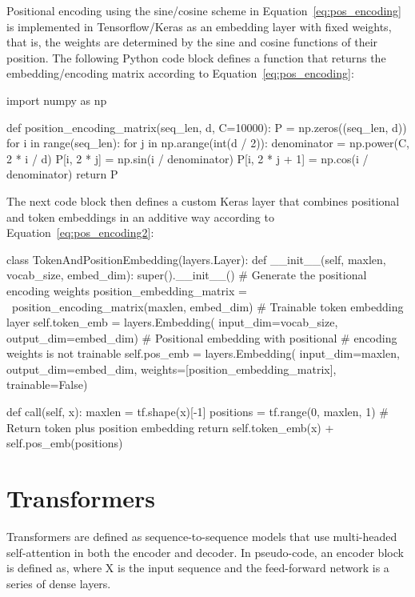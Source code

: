 Positional encoding using the sine/cosine scheme in Equation~\ref{eq:pos_encoding} is implemented  in Tensorflow/Keras as an embedding layer with fixed weights, that is, the weights are determined by the sine and cosine functions of their position. The following Python code block defines a function that returns the embedding/encoding matrix according to Equation~\ref{eq:pos_encoding}:

\begin{pythoncode}
import numpy as np

def position_encoding_matrix(seq_len, d, C=10000):
    P = np.zeros((seq_len, d))
    for i in range(seq_len):
        for j in np.arange(int(d / 2)):
            denominator = np.power(C, 2 * i / d)
            P[i, 2 * j] = np.sin(i / denominator)
            P[i, 2 * j + 1] = np.cos(i / denominator)
    return P
\end{pythoncode}

The next code block then defines a custom Keras layer that combines positional and token embeddings in an additive way according to Equation~\ref{eq:pos_encoding2}:

\begin{pythoncode}
class TokenAndPositionEmbedding(layers.Layer):
    def __init__(self, maxlen, vocab_size, embed_dim):
        super().__init__()
        # Generate the positional encoding weights
        position_embedding_matrix = \
            position_encoding_matrix(maxlen, embed_dim)
        # Trainable token embedding layer
        self.token_emb = layers.Embedding(
            input_dim=vocab_size, 
            output_dim=embed_dim)
        # Positional embedding with positional 
        # encoding weights is not trainable
        self.pos_emb = layers.Embedding(
            input_dim=maxlen, 
            output_dim=embed_dim,
            weights=[position_embedding_matrix],
            trainable=False)

    def call(self, x):
        maxlen = tf.shape(x)[-1]
        positions = tf.range(0, maxlen, 1)
        # Return token plus position embedding
        return self.token_emb(x) + self.pos_emb(positions)
\end{pythoncode}

\section{Transformers}

Transformers are defined as sequence-to-sequence models that use multi-headed self-attention in both the encoder and decoder. In pseudo-code, an encoder block is defined as, where X is the input sequence and the feed-forward network is a series of dense layers.

